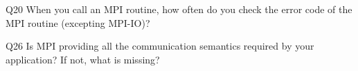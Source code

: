 \begin{description}%
\item{Q20} When you call an MPI routine, how often do you check the error code of the MPI routine  (excepting MPI-IO)?%
\item{Q26} Is MPI providing all the communication semantics required by your application? If not, what is missing?%
\end{description}%

